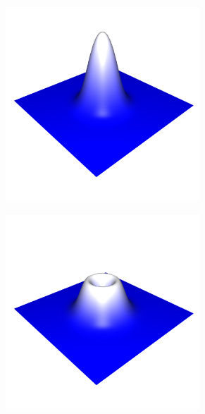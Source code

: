 \documentclass[crop=false]{standalone}
\begin{document}
    \begin{figure}[h]
      \center
      \begin{subfigure}[b]{0.32\textwidth}
        \center
        \includegraphics[trim={0 0 0 2.2cm}, clip, width=0.8\textwidth]{images/intro_01.png}
        \caption{}
      \end{subfigure}
      \begin{subfigure}[b]{0.32\textwidth}
        \center
        \includegraphics[trim={0 0 0 2.2cm}, clip, width=0.8\textwidth]{images/intro_02.png}
        \caption{}
      \end{subfigure}

\end{figure}
\end{document}
